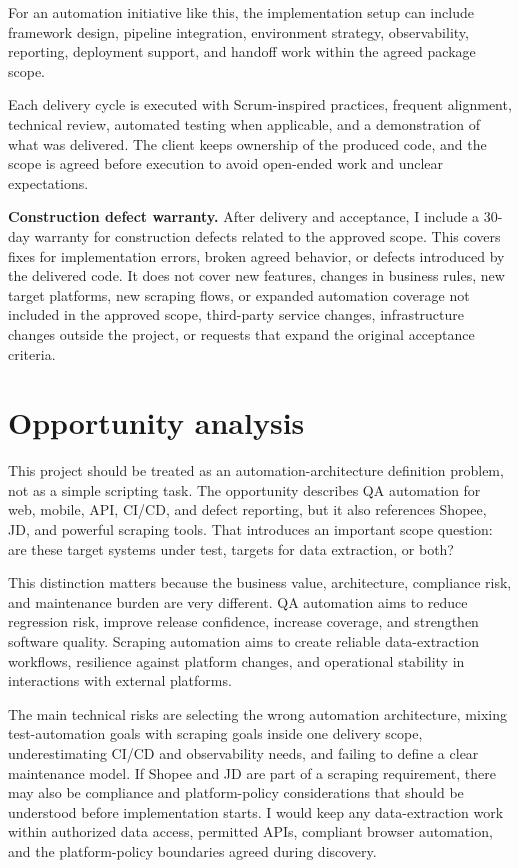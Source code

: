 \documentclass[11pt,a4paper]{article}
\begin{document}
For an automation initiative like this, the implementation setup can include framework design, pipeline integration, environment strategy, observability, reporting, deployment support, and handoff work within the agreed package scope.\par

Each delivery cycle is executed with Scrum-inspired practices, frequent alignment, technical review, automated testing when applicable, and a demonstration of what was delivered. The client keeps ownership of the produced code, and the scope is agreed before execution to avoid open-ended work and unclear expectations.\par

\textbf{Construction defect warranty.} After delivery and acceptance, I include a 30-day warranty for construction defects related to the approved scope. This covers fixes for implementation errors, broken agreed behavior, or defects introduced by the delivered code. It does not cover new features, changes in business rules, new target platforms, new scraping flows, or expanded automation coverage not included in the approved scope, third-party service changes, infrastructure changes outside the project, or requests that expand the original acceptance criteria.\par

\section*{Opportunity analysis}

This project should be treated as an automation-architecture definition problem, not as a simple scripting task. The opportunity describes QA automation for web, mobile, API, CI/CD, and defect reporting, but it also references Shopee, JD, and powerful scraping tools. That introduces an important scope question: are these target systems under test, targets for data extraction, or both?\par

This distinction matters because the business value, architecture, compliance risk, and maintenance burden are very different. QA automation aims to reduce regression risk, improve release confidence, increase coverage, and strengthen software quality. Scraping automation aims to create reliable data-extraction workflows, resilience against platform changes, and operational stability in interactions with external platforms.\par

The main technical risks are selecting the wrong automation architecture, mixing test-automation goals with scraping goals inside one delivery scope, underestimating CI/CD and observability needs, and failing to define a clear maintenance model. If Shopee and JD are part of a scraping requirement, there may also be compliance and platform-policy considerations that should be understood before implementation starts. I would keep any data-extraction work within authorized data access, permitted APIs, compliant browser automation, and the platform-policy boundaries agreed during discovery.\par
\end{document}
